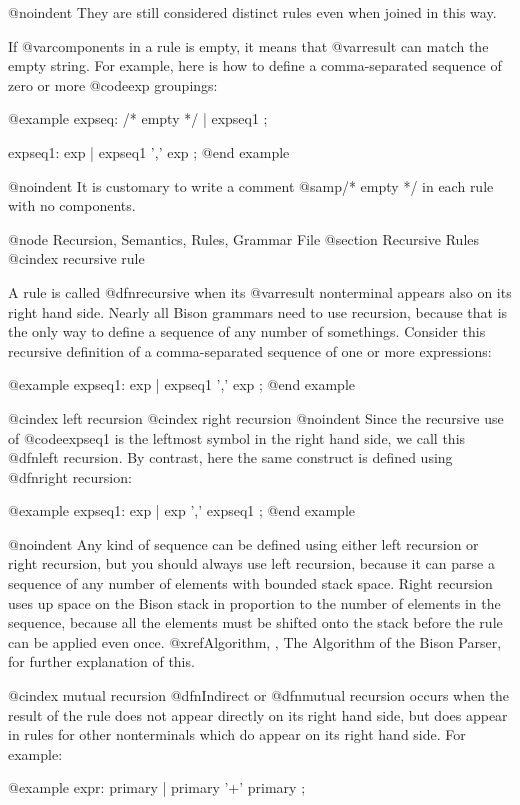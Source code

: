 {{{{{{{{{{{{{{{{{{@noindent
They are still considered distinct rules even when joined in this way.

If @var{components} in a rule is empty, it means that @var{result} can
match the empty string.  For example, here is how to define a
comma-separated sequence of zero or more @code{exp} groupings:

@example
expseq:   /* empty */
        | expseq1
        ;

expseq1:  exp
        | expseq1 ',' exp
        ;
@end example

@noindent
It is customary to write a comment @samp{/* empty */} in each rule
with no components.

@node Recursion, Semantics, Rules, Grammar File
@section Recursive Rules
@cindex recursive rule

A rule is called @dfn{recursive} when its @var{result} nonterminal appears
also on its right hand side.  Nearly all Bison grammars need to use
recursion, because that is the only way to define a sequence of any number
of somethings.  Consider this recursive definition of a comma-separated
sequence of one or more expressions:

@example
expseq1:  exp
        | expseq1 ',' exp
        ;
@end example

@cindex left recursion
@cindex right recursion
@noindent
Since the recursive use of @code{expseq1} is the leftmost symbol in the
right hand side, we call this @dfn{left recursion}.  By contrast, here
the same construct is defined using @dfn{right recursion}:

@example
expseq1:  exp
        | exp ',' expseq1
        ;
@end example

@noindent
Any kind of sequence can be defined using either left recursion or
right recursion, but you should always use left recursion, because it
can parse a sequence of any number of elements with bounded stack
space.  Right recursion uses up space on the Bison stack in proportion
to the number of elements in the sequence, because all the elements
must be shifted onto the stack before the rule can be applied even
once.  @xref{Algorithm, , The Algorithm of the Bison Parser}, for
further explanation of this.

@cindex mutual recursion
@dfn{Indirect} or @dfn{mutual} recursion occurs when the result of the
rule does not appear directly on its right hand side, but does appear
in rules for other nonterminals which do appear on its right hand
side.  For example:

@example
expr:     primary
        | primary '+' primary
        ;

}}}}}}}}}}}}}}}}}}
